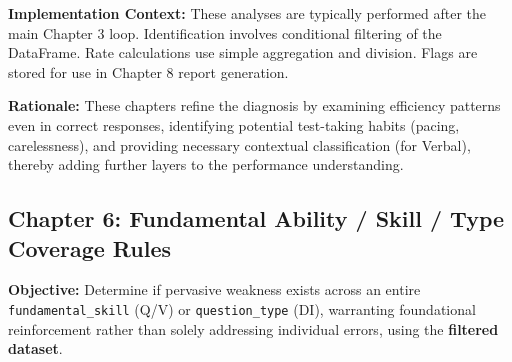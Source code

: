 \documentclass{article}
\begin{document}
\textbf{Implementation Context:} These analyses are typically performed after the main Chapter 3 loop. Identification involves conditional filtering of the DataFrame. Rate calculations use simple aggregation and division. Flags are stored for use in Chapter 8 report generation.

\textbf{Rationale:} These chapters refine the diagnosis by examining efficiency patterns even in correct responses, identifying potential test-taking habits (pacing, carelessness), and providing necessary contextual classification (for Verbal), thereby adding further layers to the performance understanding.

\subsection{Chapter 6: Fundamental Ability / Skill / Type Coverage Rules}

\textbf{Objective:} Determine if pervasive weakness exists across an entire \texttt{fundamental\_skill} (Q/V) or \texttt{question\_type} (DI), warranting foundational reinforcement rather than solely addressing individual errors, using the \textbf{filtered dataset}.
\end{document}
